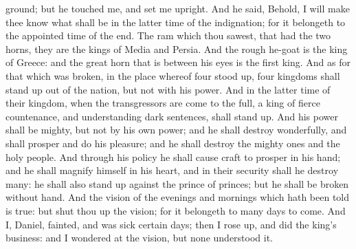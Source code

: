 ground; but he touched me, and set me upright. And he said, Behold, I will make thee know what shall be in the latter time of the indignation; for it belongeth to the appointed time of the end. The ram which thou sawest, that had the two horns, they are the kings of Media and Persia. And the rough he-goat is the king of Greece: and the great horn that is between his eyes is the first king. And as for that which was broken, in the place whereof four stood up, four kingdoms shall stand up out of the nation, but not with his power. And in the latter time of their kingdom, when the transgressors are come to the full, a king of fierce countenance, and understanding dark sentences, shall stand up. And his power shall be mighty, but not by his own power; and he shall destroy wonderfully, and shall prosper and do his pleasure; and he shall destroy the mighty ones and the holy people. And through his policy he shall cause craft to prosper in his hand; and he shall magnify himself in his heart, and in their security shall he destroy many: he shall also stand up against the prince of princes; but he shall be broken without hand. And the vision of the evenings and mornings which hath been told is true: but shut thou up the vision; for it belongeth to many days to come. And I, Daniel, fainted, and was sick certain days; then I rose up, and did the king’s business: and I wondered at the vision, but none understood it. 

